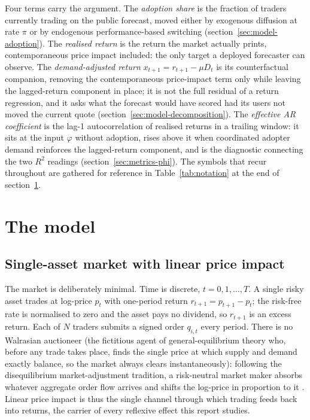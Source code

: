\documentclass[12pt]{article}
\begin{document}
Four terms carry the argument. The \emph{adoption share} is the fraction of traders currently trading on the public forecast, moved either by exogenous diffusion at rate $\pi$ or by endogenous performance-based switching (section~\ref{sec:model-adoption}). The \emph{realised return} is the return the market actually prints, contemporaneous price impact included: the only target a deployed forecaster can observe. The \emph{demand-adjusted return} $x_{t+1} = r_{t+1} - \mu D_t$ is its counterfactual companion, removing the contemporaneous price-impact term only while leaving the lagged-return component in place; it is not the full residual of a return regression, and it asks what the forecast would have scored had its users not moved the current quote (section~\ref{sec:model-decomposition}). The \emph{effective AR coefficient} is the lag-1 autocorrelation of realised returns in a trailing window: it sits at the input $\varphi$ without adoption, rises above it when coordinated adopter demand reinforces the lagged-return component, and is the diagnostic connecting the two $R^{2}$ readings (section~\ref{sec:metrics-phi}). The symbols that recur throughout are gathered for reference in Table~\ref{tab:notation} at the end of section~\ref{sec:model}. %


\section{The model}\label{sec:model}

\subsection{Single-asset market with linear price impact}\label{sec:model-market}

The market is deliberately minimal. Time is discrete, $t = 0, 1, \ldots, T$. A single risky asset trades at log-price $p_t$ with one-period return $r_{t+1} = p_{t+1} - p_t$; the risk-free rate is normalised to zero and the asset pays no dividend, so $r_{t+1}$ is an excess return. Each of $N$ traders submits a signed order $q_{i,t}$ every period. %
There is no Walrasian auctioneer (the fictitious agent of general-equilibrium theory who, before any trade takes place, finds the single price at which supply and demand exactly balance, so the market always clears instantaneously): following the disequilibrium market-adjustment tradition, a risk-neutral market maker absorbs whatever aggregate order flow arrives and shifts the log-price in proportion to it \citep{beja1980,farmerjoshi2002}. Linear price impact is thus the single channel through which trading feeds back into returns, the carrier of every reflexive effect this report studies. %
\end{document}
